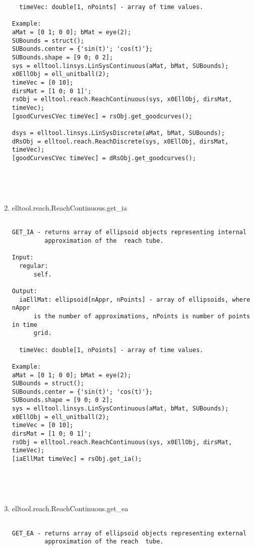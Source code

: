 \begin{enumerate}
\begin{lstlisting}
  timeVec: double[1, nPoints] - array of time values.

Example:
aMat = [0 1; 0 0]; bMat = eye(2);
SUBounds = struct();
SUBounds.center = {'sin(t)'; 'cos(t)'};
SUBounds.shape = [9 0; 0 2];
sys = elltool.linsys.LinSysContinuous(aMat, bMat, SUBounds);
x0EllObj = ell_unitball(2);
timeVec = [0 10];
dirsMat = [1 0; 0 1]';
rsObj = elltool.reach.ReachContinuous(sys, x0EllObj, dirsMat, timeVec);
[goodCurvesCVec timeVec] = rsObj.get_goodcurves();

dsys = elltool.linsys.LinSysDiscrete(aMat, bMat, SUBounds);
dRsObj = elltool.reach.ReachDiscrete(sys, x0EllObj, dirsMat, timeVec);
[goodCurvesCVec timeVec] = dRsObj.get_goodcurves();





\end{lstlisting}
\fontfamily{\familydefault}
\selectfont
\item {elltool.reach.ReachContinuous.get\_ia}
\selectfont
\begin{lstlisting}

GET_IA - returns array of ellipsoid objects representing internal
         approximation of the  reach tube.

Input:
  regular:
      self.

Output:
  iaEllMat: ellipsoid[nAppr, nPoints] - array of ellipsoids, where nAppr
      is the number of approximations, nPoints is number of points in time
      grid.

  timeVec: double[1, nPoints] - array of time values.

Example:
aMat = [0 1; 0 0]; bMat = eye(2);
SUBounds = struct();
SUBounds.center = {'sin(t)'; 'cos(t)'};
SUBounds.shape = [9 0; 0 2];
sys = elltool.linsys.LinSysContinuous(aMat, bMat, SUBounds);
x0EllObj = ell_unitball(2);
timeVec = [0 10];
dirsMat = [1 0; 0 1]';
rsObj = elltool.reach.ReachContinuous(sys, x0EllObj, dirsMat, timeVec);
[iaEllMat timeVec] = rsObj.get_ia();





\end{lstlisting}
\fontfamily{\familydefault}
\selectfont
\item {elltool.reach.ReachContinuous.get\_ea}
\selectfont
\begin{lstlisting}

GET_EA - returns array of ellipsoid objects representing external
         approximation of the reach  tube.


\end{lstlisting}
\end{enumerate}

